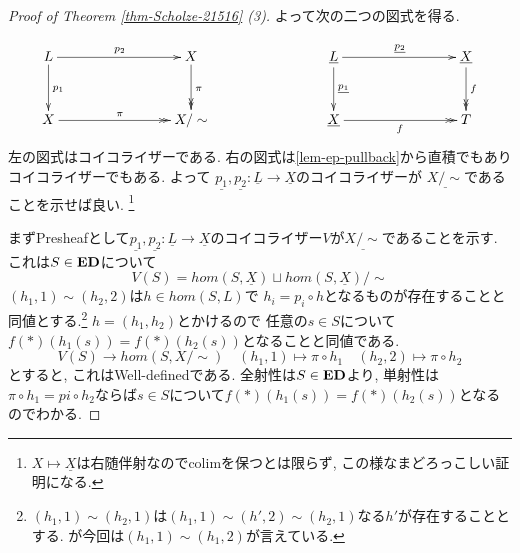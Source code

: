 \documentclass[dvipdfmx,a4paper,11pt]{article}
\theoremstyle{definition}
\begin{document}
\begin{proof}[Proof of Theorem \ref{thm-Scholze-21516} (3)]
\begin{comment}
$g^{-1}(\overline{f(\ast)}(V))$が開集合であることは
$p(\ast)^{-1}(g^{-1}(\overline{f(\ast)}(V)))$が開集合であることと同値である. ここで
$$
p(\ast)^{-1}(g^{-1}(\overline{f(\ast)}(V)))
=
q(\ast)^{-1}(f(\ast)^{-1} (\overline{f(\ast)}(V)))
=
q(\ast)^{-1}(\pi^{-1}V)
$$
である. ここで$\pi : X \to X / \sim$とする.
$q(\ast)^{-1}(\pi^{-1}V)$は$W$の開集合なので言えた. 
ここで$g$と$g(\ast)$を同一視している. また
$$
Z = \{ (z,w) \in X \times Y | f(\ast)(z) = g(\ast)(w)\}
$$
である.
$q : Z \to Y$は$X \to T(\ast)_{top} $が全射なので全射になる.
よって$q : Z \to Y$はコンパクトハウスドルフ空間の間の全射より商写像である.
よって$g^{-1}(V)$が開集合であることは$(g\circ q)^{-1}(V)$が開集合であることと同値である.
$(g\circ q)^{-1}(V) = p^{-1}(f^{-1}(V))$であり$f,p$ともに連続であるので, $(g\circ q)^{-1}(V)$が開集合である.よっていえた.
\end{comment}
よって次の二つの図式を得る.

\begin{equation*}
\xymatrix@C=80pt@R=30pt{
L\ar@{->}[r]^{p_2}\ar@{->}[d]^{p_1}
&X \ar@{->>}[d]^{\pi}
&
\underline{L}\ar@{->}[r]^{\underline{p_2}}
\ar@{->}[d]^{\underline{p_1}}
& \underline{X}\ar@{->>}[d]^{f}
\\
X \ar@{->>}[r]^{\pi}
&X/\sim
&
 \underline{X} \ar@{->>}[r]_{f}
& T
 \\   
}
\end{equation*}
左の図式はコイコライザーである. 
右の図式は\ref{lem-ep-pullback}から直積でもありコイコライザーでもある. 
よって
$\underline{p_1}, \underline{p_2} : \underline{L} \to \underline{X}$のコイコライザーが
$\underline{X/\sim}$であることを示せば良い. \footnote{$X \mapsto \underline{X}$は右随伴射なのでcolimを保つとは限らず, この様なまどろっこしい証明になる.}

まずPresheafとして$\underline{p_1}, \underline{p_2} : \underline{L} \to \underline{X}$のコイコライザー$V$が$\underline{X/\sim}$であることを示す. 
これは$S \in {\bf ED}$について
$$
V(S) =hom(S, \underline{X})\sqcup hom(S, \underline{X})/\sim
$$
$(h_1,1) \sim (h_2,2) $は$h \in hom(S,L)$で
$h_i = p_i \circ h $となるものが存在することと同値とする.\footnote{$(h_1,1) \sim (h_2,1)$は$(h_1,1) \sim (h',2) \sim (h_2,1)$なる$h'$が存在することとする. が今回は$(h_1,1)\sim (h_1,2)$が言えている. }
$h = (h_1, h_2)$とかけるので
任意の$s \in S$について$f(\ast)(h_1(s)) = f(\ast)(h_2(s))$となることと同値である. 
$$
V(S) \to hom(S,X/\sim)
\quad
(h_1,1) \mapsto \pi \circ h_1
\quad
(h_2,2) \mapsto \pi \circ h_2
$$
とすると, これはWell-definedである. 
全射性は$S \in {\bf ED}$より, 単射性は
$\pi \circ h_1 = pi \circ h_2$ならば$s \in S$について$f(\ast)(h_1(s)) = f(\ast)(h_2(s))$となるのでわかる. 


\end{proof}
\end{document}
